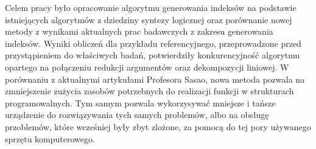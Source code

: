 Celem pracy było opracowanie algorytmu generowania indeksów na podstawie istniejących algorytmów z dziedziny syntezy logicznej
oraz porównanie nowej metody z wynikami aktualnych prac badawczych z zakresu generowania indeksów.
Wyniki obliczeń dla przykładu referencyjnego,
przeprowadzone przed przystąpieniem do właściwych badań,
potwierdziły konkurencyjność algorytmu opartego na połączeniu redukcji argumentów oraz dekompozycji liniowej.
W porównaniu z aktualnymi artykułami Profesora Sasao,
nowa metoda pozwala na zmniejszenie zużycia zasobów potrzebnych do realizacji funkcji w strukturach programowalnych.
Tym samym pozwala wykorzysywać mniejsze i tańsze urządzenie do rozwiązywania tych samych problemów,
albo na obsługę przoblemów, które wcześniej były zbyt zlożone,
za pomocą do tej pory używanego sprzętu komputerowego.
